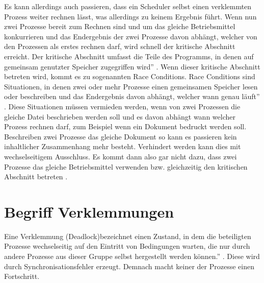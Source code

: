 Es kann allerdings auch passieren, dass ein Scheduler selbst einen verklemmten Prozess weiter rechnen lässt, was allerdings zu keinem Ergebnis führt.
Wenn nun zwei Prozesse bereit zum Rechnen sind und um das gleiche Betriebsmittel konkurrieren und das Endergebnis der zwei Prozesse davon abhängt, welcher von den Prozessen als erstes rechnen darf, wird schnell der kritische Abschnitt erreicht. Der kritische Abschnitt umfasst \glqq die Teile des Programms, in denen auf gemeinsam genutzter Speicher zugegriffen wird'' \parencite[S. 164]{tanenbaum2016}. Wenn dieser kritische Abschnitt betreten wird, kommt es zu sogenannten Race Conditions. Race Conditions sind Situationen, \glqq in denen zwei oder mehr Prozesse einen gemeinsamen Speicher lesen oder beschreiben und das Endergebnis davon abhängt, welcher wann genau läuft'' \parencite[S. 166 f.]{tanenbaum2016}. Diese Situationen müssen vermieden werden, wenn von zwei Prozessen die gleiche Datei beschrieben werden soll und es davon abhängt wann welcher Prozess rechnen darf, zum Beispiel wenn ein Dokument bedruckt werden soll. Beschreiben zwei Prozesse das gleiche Dokument so kann es passieren kein inhaltlicher Zusammenhang mehr besteht. Verhindert werden kann dies mit wechselseitigem Ausschluss. Es kommt dann also gar nicht dazu, dass zwei Prozesse das gleiche Betriebsmittel verwenden bzw. gleichzeitig den kritischen Abschnitt betreten \parencite [vgl][S.471]{sommer2002}.

\section{Begriff Verklemmungen}
\glqq Eine Verklemmung (Deadlock)bezeichnet einen Zustand, in dem die beteiligten Prozesse wechselseitig auf den Eintritt von Bedingungen warten, die nur durch andere Prozesse aus dieser Gruppe selbst hergestellt werden können.'' \parencite[S.248]{sturm2001}. Diese wird durch Synchronisationsfehler erzeugt. 
Demnach macht keiner der Prozesse einen Fortschritt.

